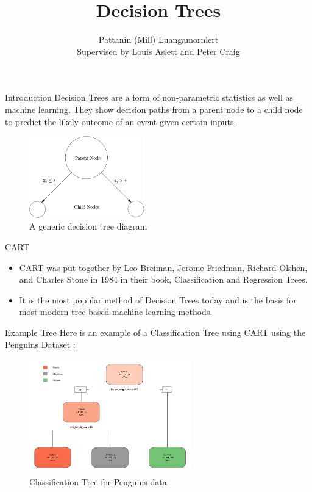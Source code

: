 \documentclass[12pt]{beamer}
\title{Decision Trees}
\author[Pattanin (Mill) Luangamornlert]{Pattanin (Mill) Luangamornlert\\[1ex]  {\small Supervised by Louis Aslett and Peter Craig}}
\institute{Durham University}
\begin{document}
\frame{\titlepage}

\begin{frame}{Introduction}
   Decision Trees are a form of non-parametric statistics as well as machine learning. They show decision paths from a parent node to a child node to predict the likely outcome of an event given certain inputs.
   \begin{figure}
       \centering
       \includegraphics[width = 5cm]{ipefile/simpledecisionsplit.png}
       \caption{A generic decision tree diagram}
       \label{fig:basicdt}
   \end{figure}
\end{frame}



\begin{frame}{CART}
\begin{itemize}
    \item CART \cite{BreimanDT} was put together by Leo Breiman, Jerome Friedman, Richard Olshen, and Charles Stone in 1984 in their book, Classification and Regression Trees.
    
    \item It is the most popular method of Decision Trees today and is the basis for most modern tree based machine learning methods.
\end{itemize}
\end{frame}

\begin{frame}{Example Tree}
    Here is an example of a Classification Tree using CART using the Penguins Dataset \cite{penguins}:
    \begin{figure}
        \centering
        \includegraphics[width = 7cm]{presentation/Penguintree.pdf}
        \caption{Classification Tree for Penguins data}
        \label{fig:pentree}
    \end{figure}
\end{frame}
\end{document}
